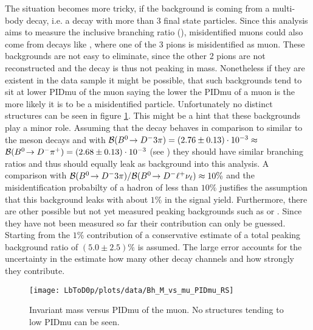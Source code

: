 The situation becomes more tricky, if the background is coming from a multi-body \Lb decay, i.e. a decay with more than 3 final state particles.
Since this analysis aims to measure the inclusive branching ratio \BR(\LbToDpmunuX), misidentified muons could also come from decays like \decay{\Lb}{\Dz\proton 3\pi}, where one of the 3 pions is misidentified as muon.
These backgrounds are not easy to eliminate, since the other 2 pions are not reconstructed and the decay is thus not peaking in \Dz\proton\mun mass.
Nonetheless if they are existent in the data sample it might be possible, that such backgrounds tend to sit at lower PIDmu of the muon saying the lower the PIDmu of a muon is the more likely it is to be a misidentified particle.
Unfortunately no distinct structures can be seen in figure \ref{fig:plot_D0pmuMass_vs_muPIDmu}.
This might be a hint that these backgrounds play a minor role.
Assuming that the decay \decay{\Lb}{\Dz\proton 3\pi} behaves in comparison to \decay{\Lb}{\Dz\proton\pim} similar to the meson decays \decay{\Bd}{\Dm 3\pi} and \decay{\Bd}{\Dm\pip} with 
${\cal B}({{B}^0}\!\rightarrow {\ensuremath{{D}^-}} 3\pi) = (2.76 \pm 0.13) \cdot 10^{-3} \approx$ 
${\cal B}({{B}^0}\!\rightarrow {\ensuremath{{D}^-}}{\ensuremath{{\pi}^+}}) = (2.68 \pm 0.13) \cdot 10^{-3}$ (see \cite{PDG})
they should have similar branching ratios and thus should equally leak as background into this analysis.
A comparison with ${\cal B}({{B}^0}\!\rightarrow {\ensuremath{{D}^-}} 3\pi)/{\cal B}({{B}^0}\!\rightarrow {\ensuremath{{D}^-}}{\ensuremath{\ell^+}}{\ensuremath{{\nu}_\ell}}) \approx 10\%$ and the misidentification probabilty of a hadron of less than $10\%$ \cite{muonID_Performance} justifies the assumption that this background leaks with about $1\%$ in the signal yield.
Furthermore, there are other possible but not yet measured peaking backgrounds such as \decay{\Lb}{\Dz\proton\rhom} or \decay{\Lb}{\Dz\proton\pim\rhoz}.
Since they have not been measured so far their contribution can only be guessed.
Starting from the $1\%$ contribution of \decay{\Lb}{\Dz\proton 3\pi} a conservative estimate of a total peaking background ratio of $(5.0 \pm 2.5)\%$ is assumed.
The large error accounts for the uncertainty in the estimate how many other decay channels and how strongly they contribute.
\begin{figure}[tb]
	\centering
	\texttt{[image: LbToD0p/plots/data/Bh\_M\_vs\_mu\_PIDmu\_RS]}
	\caption{Invariant \Dz\proton\mun mass versus PIDmu of the muon. No structures tending to low PIDmu can be seen.}
	\label{fig:plot_D0pmuMass_vs_muPIDmu}
\end{figure}

